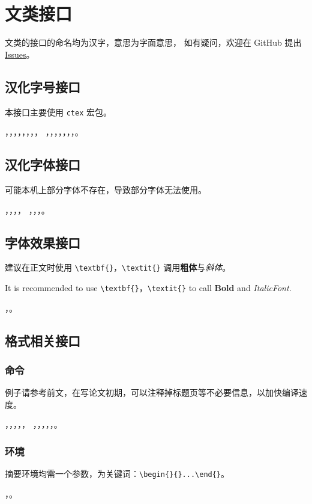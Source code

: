 \section{文类接口}
文类的接口的命名均为汉字，意思为字面意思，
如有疑问，欢迎在 GitHub 提出 \href{https://github.com/Iydon/sustechthesis/issues}{Issues}。

\subsection{汉化字号接口}
本接口主要使用 \texttt{ctex} 宏包。

，，，，，，，，
，，，，，，，。

\subsection{汉化字体接口}
可能本机上部分字体不存在，导致部分字体无法使用。

，，，，
，，，。

\subsection{字体效果接口}

建议在正文时使用 \verb|\textbf{}|，\verb|\textit{}| 调用\textbf{粗体}与\textit{斜体}。

It is recommended to use \verb|\textbf{}|，\verb|\textit{}| to call \textbf{Bold} and \textit{ItalicFont}.

，。

\subsection{格式相关接口}
\subsubsection{命令}
例子请参考前文，在写论文初期，可以注释掉标题页等不必要信息，以加快编译速度。

，，，，，
，，，，，。

\subsubsection{环境}
摘要环境均需一个参数，为关键词：\verb|\begin{}{}...\end{}|。

，。
